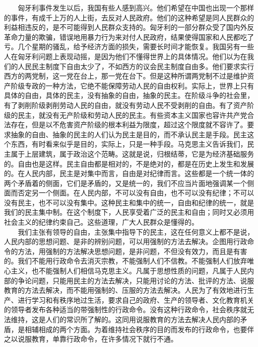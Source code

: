 \documentclass[cn,11pt,chinese]{elegantbook}
\begin{document}
　　匈牙利事件发生以后，我国有些人感到高兴。他们希望在中国也出现一个那样的事件，有成千上万的人上街，去反对人民政府。他们的这种希望是同人民群众的利益相违反的，是不可能得到人民群众支持的。匈牙利的一部分群众受了国内外反革命力量的欺骗，错误地用暴力行为来对付人民政府，结果使得国家和人民都吃了亏。几个星期的骚乱，给予经济方面的损失，需要长时间才能恢复。我国另有一些人在匈牙利问题上表现动摇，是因为他们不懂得世界上的具体情况。他们以为在我们的人民民主制度下自由太少了，不如西方的议会民主制度自由多。他们要求实行西方的两党制，这一党在台上，那一党在台下。但是这种所谓两党制不过是维护资产阶级专政的一种方法，它绝不能保障劳动人民的自由权利。实际上，世界上只有具体的自由，具体的民主，没有抽象的自由，抽象的民主。在阶级斗争的社会里，有了剥削阶级剥削劳动人民的自由，就没有劳动人民不受剥削的自由。有了资产阶级的民主，就没有无产阶级和劳动人民的民主。有些资本主义国家也容许共产党合法存在，但是以不危害资产阶级的根本利益为限度，超过这个限度就不容许了。要求抽象的自由、抽象的民主的人们认为民主是目的，而不承认民主是手段。民主这个东西，有时看来似乎是目的，实际上，只是一种手段。马克思主义告诉我们，民主属于上层建筑，属于政治这个范畴。这就是说，归根结蒂，它是为经济基础服务的。自由也是这样。民主自由都是相对的，不是绝对的，都是在历史上发生和发展的。在人民内部，民主是对集中而言，自由是对纪律而言。这些都是一个统一体的两个矛盾着的侧面，它们是矛盾的，又是统一的，我们不应当片面地强调某一个侧面而否定另一个侧面。在人民内部，不可以没有自由，也不可以没有纪律；不可以没有民主，也不可以没有集中。这种民主和集中的统一，自由和纪律的统一，就是我们的民主集中制。在这个制度下，人民享受着广泛的民主和自由；同时又必须用社会主义的纪律约束自己。这些道理，广大人民群众是懂得的。\\
　　我们主张有领导的自由，主张集中指导下的民主，这在任何意义上都不是说，人民内部的思想问题、是非的辨别问题，可以用强制的方法去解决。企图用行政命令的方法，用强制的方法解决思想问题，是非问题，不但没有效力，而且是有害的。我们不能用行政命令去消灭宗教，不能强制人们不信教。不能强制人们放弃唯心主义，也不能强制人们相信马克思主义。凡属于思想性质的问题，凡属于人民内部的争论问题，只能用民主的方法去解决，只能用讨论的方法、批评的方法、说服教育的方法去解决，而不能用强制的、压服的方法去解决。人民为了有效地进行生产、进行学习和有秩序地过生活，要求自己的政府、生产的领导者、文化教育机关的领导者发布各种适当的带强制性的行政命令。没有这种行政命令，社会秩序就无法维持，这是人们的常识所了解的。这同用说服教育的方法去解决人民内部的矛盾，是相辅相成的两个方面。为着维持社会秩序的目的而发布的行政命令，也要伴之以说服教育，单靠行政命令，在许多情况下就行不通。\\
\end{document}
